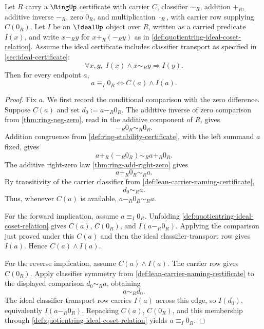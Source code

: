\begin{theorem}
\label{thm:quotientring-zero-coset-classification}
Let $R$ carry a $\RingUp$ certificate with carrier $C$, classifier $\sim_R$, addition $+_R$, additive inverse $-_R$, zero $0_R$, and multiplication $\cdot_R$, with carrier row supplying $C(0_R)$. Let $I$ be an $\IdealUp$ object over $R$, written as a carried predicate $I(x)$, and write $x-_R y$ for $x+_R(-_R y)$ as in \autoref{def:quotientring-ideal-coset-relation}. Assume the ideal certificate includes classifier transport as specified in \autoref{sec:ideal-certificate}:
$$
\forall x,y,\; I(x)\land x\sim_R y\Longrightarrow I(y).
$$
Then for every endpoint $a$,
$$
a\equiv_I 0_R \Longleftrightarrow C(a)\land I(a).
$$
\end{theorem}
\begin{proof}
Fix $a$. We first record the conditional comparison with the zero difference. Suppose $C(a)$ and set $d_0:=a-_R 0_R$. The additive inverse of zero comparison from \autoref{thm:ring-neg-zero}, read in the additive component of $R$, gives
$$
-_R 0_R\sim_R 0_R.
$$
Addition congruence from \autoref{def:ring-stability-certificate}, with the left summand $a$ fixed, gives
$$
a+_R(-_R 0_R)\sim_R a+_R0_R.
$$
The additive right-zero law \autoref{thm:ring-add-right-zero} gives
$$
a+_R0_R\sim_R a.
$$
By transitivity of the carrier classifier from \autoref{def:lean-carrier-naming-certificate},
$$
d_0\sim_R a.
$$
Thus, whenever $C(a)$ is available, $a-_R 0_R\sim_R a$.

For the forward implication, assume $a\equiv_I 0_R$. Unfolding \autoref{def:quotientring-ideal-coset-relation} gives $C(a)$, $C(0_R)$, and $I(a-_R 0_R)$. Applying the comparison just proved under this $C(a)$ and then the ideal classifier-transport row gives $I(a)$. Hence $C(a)\land I(a)$.

For the reverse implication, assume $C(a)\land I(a)$. The carrier row gives $C(0_R)$. Apply classifier symmetry from \autoref{def:lean-carrier-naming-certificate} to the displayed comparison $d_0\sim_R a$, obtaining
$$
a\sim_R d_0.
$$
The ideal classifier-transport row carries $I(a)$ across this edge, so $I(d_0)$, equivalently $I(a-_R 0_R)$. Repacking $C(a)$, $C(0_R)$, and this membership through \autoref{def:quotientring-ideal-coset-relation} yields $a\equiv_I 0_R$.
\end{proof}

